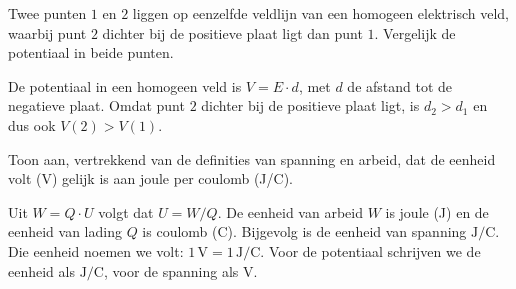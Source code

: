 \documentclass{ximera}
\begin{document}
\begin{question}
    Twee punten $1$ en $2$ liggen op eenzelfde veldlijn van een homogeen elektrisch veld, waarbij punt $2$ dichter bij de positieve plaat ligt dan punt $1$. Vergelijk de potentiaal in beide punten.

    \begin{multipleChoice}
    \end{multipleChoice}

    \begin{solution}\nl
        De potentiaal in een homogeen veld is $V = E \cdot d$, met $d$ de afstand tot de negatieve plaat. Omdat punt $2$ dichter bij de positieve plaat ligt, is $d_2 > d_1$ en dus ook $V(2) > V(1)$.
    \end{solution}
\end{question}

\begin{question}
    Toon aan, vertrekkend van de definities van spanning en arbeid, dat de eenheid volt (V) gelijk is aan joule per coulomb (J/C).

    \begin{solution}\nl
        Uit $W = Q \cdot U$ volgt dat $U = W/Q$. De eenheid van arbeid $W$ is joule (J) en de eenheid van lading $Q$ is coulomb (C). Bijgevolg is de eenheid van spanning $\mathrm{J/C}$. Die eenheid noemen we volt: $1 \, \mathrm{V} = 1 \, \mathrm{J/C}$. Voor de potentiaal schrijven we de eenheid als $\mathrm{J/C}$, voor de spanning als $\mathrm{V}$.
    \end{solution}
\end{question}
\end{document}
